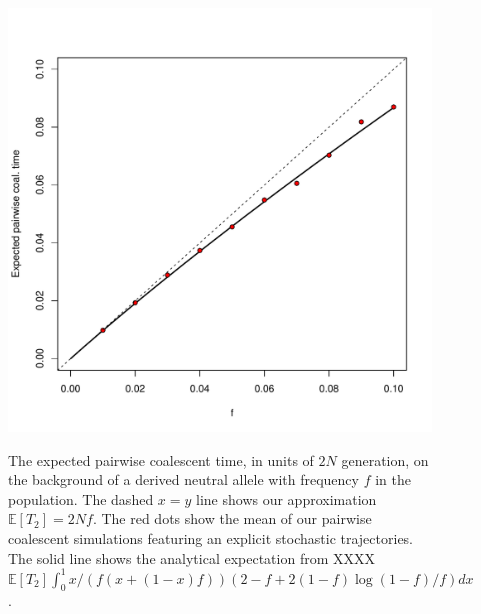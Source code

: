 \documentclass[a4paper,10pt]{article}
\begin{document}
\begin{figure}
	\includegraphics[width = \textwidth]{../Paper_Figures/n_two_coal_time.pdf} \label{n_2_supp_plot}
\caption{The expected pairwise coalescent time, in units of $2N$ generation, on the background of a derived neutral allele with frequency $f$ in the population.  The dashed $x=y$ line shows our approximation $\mathbb{E}  [T_2]=2Nf$. The red dots show the mean of our pairwise coalescent simulations featuring an explicit stochastic trajectories. The solid line shows the analytical expectation from XXXX  
$\mathbb{E} [T_2] \int_0^1 x/(f (x+(1-x)f))(2-f+2(1-f) \log(1-f)/f) dx $.}
\end{figure}   %
\end{document}
